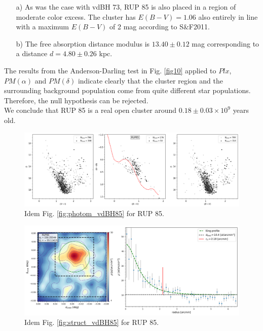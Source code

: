 \documentclass[draft]{aa}
\begin{document}
\begin{itemize}
\item [a)] As was the case with vdBH 73, RUP 85 is also placed
    in a region of moderate color excess. The cluster has $E(B-V)=1.06$
    also entirely in line with a maximum $E(B-V)$ of 2 mag according to
    S\&F2011.
\item [b)] The free absorption distance modulus is $13.40\pm0.12$ mag
corresponding to a distance $d=4.80\pm0.26$ kpc.
\end{itemize}

The results from the Anderson-Darling test in Fig. \ref{fig10} applied to $Plx$,
$PM(\alpha)$ and $PM(\delta)$ indicate clearly that the cluster region and the
surrounding background population come from quite different star populations.
Therefore, the null hypothesis can be rejected.\\

We conclude that RUP 85 is a real open cluster around $0.18\pm0.03\times10^9$
years old.

\begin{figure}[ht]
    \centering
    \includegraphics[width=\hsize]{../figs/obs_RUP85.png}
    \caption{Idem Fig. \ref{fig:photom_vdBH85} for RUP 85.}
    \label{fig7}
\end{figure}

\begin{figure}[ht]
    \centering
    \includegraphics[width=\hsize]{../figs/dmap_rup85.png}
    \caption{Idem Fig. \ref{fig:struct_vdBH85} for RUP 85.}
    \label{fig8}
\end{figure}
\end{document}
